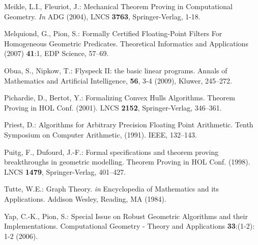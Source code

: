 \documentclass{llncs}
\begin{document}
\begin{thebibliography}{99}
Meikle, L.I., Fleuriot, J.:
Mechanical Theorem Proving in Computational Geometry.
{\em In} ADG (2004), LNCS {\bfseries 3763}, Springer-Verlag, 1-18.

Melquiond, G., Pion, S.:
{F}ormally {C}ertified {F}loating-{P}oint {F}ilters {F}or {H}omogeneous {G}eometric {P}redicates.
{T}heoretical {I}nformatics and {A}pplications (2007) {\bfseries 41}:1,
EDP Science, 57--69.

Obua, S., Nipkow, T.:
Flyspeck II: the basic linear programs.
Annals of Mathematics and Artificial Intelligence,
{\bfseries 56}, 3-4 (2009), Kluwer, 245--272.

Pichardie, D., Bertot, Y.:
Formalizing Convex Hulls Algorithms.
Theorem Proving in HOL Conf. (2001).
LNCS {\bfseries 2152}, Springer-Verlag, 346--361.

Priest, D.:
Algorithms for Arbitrary Precision Floating Point Arithmetic.
Tenth Symposium on Computer Arithmetic, (1991).  IEEE, 132--143.

Puitg, F., Dufourd, J.-F.:
Formal specifications and theorem proving breakthroughs in geometric
modelling.
Theorem Proving in HOL Conf. (1998). LNCS {\bfseries 1479},
Springer-Verlag, 401--427.

Tutte, W.E.:
Graph Theory.
{\em in} Encyclopedia of Mathematics and its Applications. Addison Wesley, Reading, MA (1984).

Yap, C.-K., Pion, S.: 
Special Issue on Robust Geometric Algorithms and their Implementations. 
Computational Geometry - Theory and Applications {\bfseries 33}:(1-2): 1-2 (2006).
\end{thebibliography}
\end{document}

